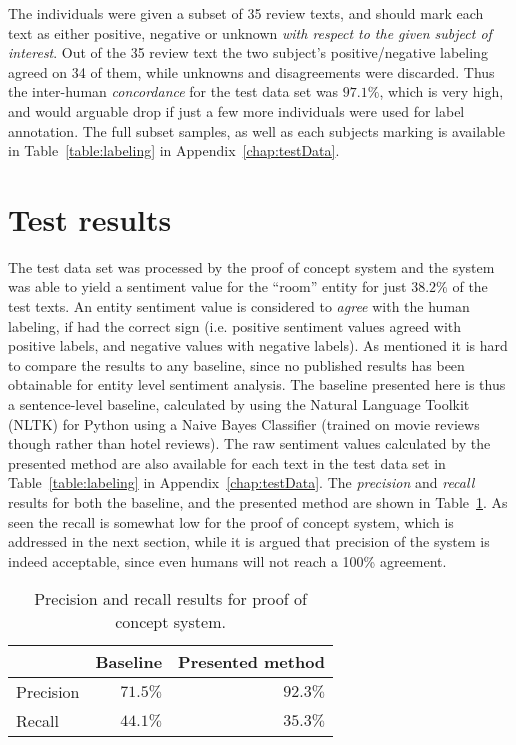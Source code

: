 The individuals were given a subset of 35 review texts, and should mark each text as either positive, negative or unknown \emph{with respect to the given subject of interest}. Out of the 35 review text the two subject's positive/negative labeling agreed on 34 of them, while unknowns and disagreements were discarded. Thus the inter-human \emph{concordance} for the test data set was $97.1\%$, which is very high, and would arguable drop if just a few more individuals were used for label annotation. The full subset samples, as well as each subjects marking is available in Table~\ref{table:labeling} in Appendix~\ref{chap:testData}.

\section{Test results}
The test data set was processed by the proof of concept system and the system was able to yield a sentiment value for the ``room'' entity for just $38.2\%$ of the test texts. An entity sentiment value is considered to \emph{agree} with the human labeling, if had the correct sign (i.e. positive sentiment values agreed with positive labels, and negative values with negative labels). As mentioned it is hard to compare the results to any baseline, since no published results has been obtainable for entity level sentiment analysis. The baseline presented here is thus a sentence-level baseline, calculated by using the Natural Language Toolkit (NLTK) for Python using a Naive Bayes Classifier (trained on movie reviews though rather than hotel reviews). The raw sentiment values calculated by the presented method are also available for each text in the test data set in Table~\ref{table:labeling} in Appendix~\ref{chap:testData}. The \emph{precision} and \emph{recall} results for both the baseline, and the presented method are shown in Table~\ref{table:results}. As seen the recall is somewhat low for the proof of concept system, which is addressed in the next section, while it is argued that precision of the system is indeed acceptable, since even humans will not reach a 100\% agreement.
\begin{table}[ht]
\center
\begin{tabular}{l|rr}
	          & Baseline & Presented method \\ \hline
	Precision & $71.5\%$ & $92.3\%$ \\
	Recall    & $44.1\%$ & $35.3\%$ 
\end{tabular}
\caption{Precision and recall results for proof of concept system.}
\label{table:results}
\end{table}

